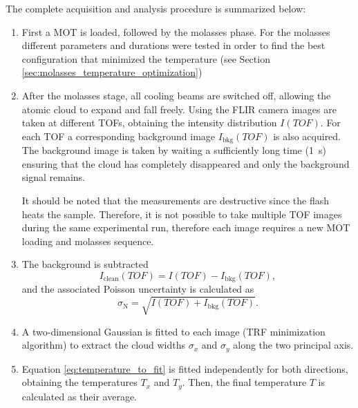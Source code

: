 The complete acquisition and analysis procedure is summarized below:
\begin{enumerate}
    \item First a MOT is loaded, followed by the molasses phase. For the molasses different parameters and durations were tested in order to find the best configuration that minimized the temperature (see Section \ref{sec:molasses_temperature_optimization})
 
    \item After the molasses stage, all cooling beams are switched off, allowing the atomic cloud to expand and fall freely. Using the FLIR camera images are taken at different TOFs, obtaining the intensity distribution $I(TOF)$. For each TOF a corresponding background image $I_\text{bkg}(TOF)$ is also acquired. The background image is taken by waiting a sufficiently long time (1~s) ensuring that the cloud has completely disappeared and only the background signal remains.
    
    It should be noted that the measurements are destructive since the flash heats the sample. Therefore, it is not possible to take multiple TOF images during the same experimental run, therefore each image requires a new MOT loading and molasses sequence. 

    \item The background is subtracted 
    \begin{equation}
        I_\text{clean}(TOF)=I(TOF)-I_\text{bkg}(TOF),
    \end{equation}
    and the associated Poisson uncertainty is calculated as     
    \begin{equation}
        \sigma_\text{N} = \sqrt{I(TOF)+I_\text{bkg}(TOF)}.
    \end{equation}
    
    \item A two-dimensional Gaussian is fitted to each image (TRF minimization algorithm) to extract the cloud widths $\sigma_x$ and $\sigma_y$ along the two principal axis.
    
    \item Equation \eqref{eq:temperature_to_fit} is fitted independently  for both directions, obtaining the temperatures $T_x$ and $T_y$. Then, the final temperature $T$ is calculated as their average.
    
\end{enumerate}

